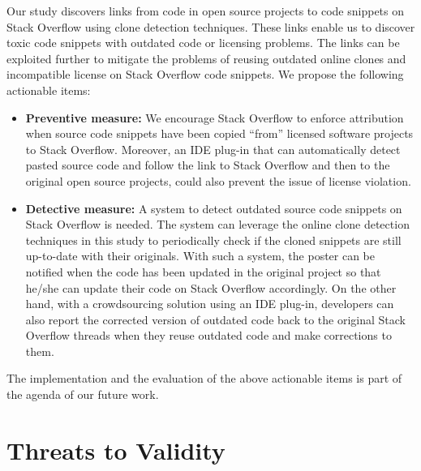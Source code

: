 \documentclass[10pt,journal,compsoc]{IEEEtran}
\begin{document}
Our study discovers links from code in open source projects to code snippets on
Stack Overflow using clone detection techniques. These links enable us to
discover toxic code snippets with outdated code or licensing problems. 
The links can be exploited further to mitigate the problems of reusing outdated online clones and
incompatible license on Stack Overflow code snippets. We propose the following
actionable items: 

\begin{itemize} 
	\item \textbf{Preventive measure:} We
	encourage Stack Overflow to enforce attribution when source code snippets have
	been copied ``from'' licensed software projects to Stack Overflow. Moreover, an
	IDE plug-in that can automatically detect pasted source code and follow the link
	to Stack Overflow and then to the original open source projects, could also
	prevent the issue of license violation. 
	\item \textbf{Detective measure:} A
	system to detect outdated source code snippets on Stack Overflow is needed. The
	system can leverage the online clone detection techniques in this study to
	periodically check if the cloned snippets are still up-to-date with their
	originals. %
	With such a system, the poster can be notified when the code has been updated
	in the original project so that he/she can update their code on Stack Overflow
	accordingly. On the other hand, with a crowdsourcing solution using an IDE
	plug-in, developers can also report the corrected version of outdated code back
	to the original Stack Overflow threads when they reuse outdated code and make
	corrections to them. 
\end{itemize} 

The implementation and the evaluation of the
above actionable items is part of the agenda of our future work.

\section{Threats to Validity}
\end{document}
